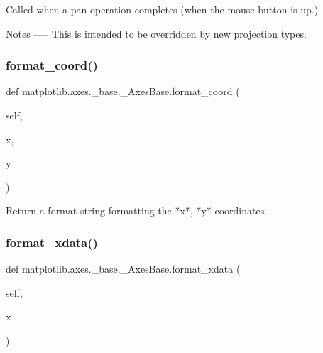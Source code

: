 \begin{DoxyVerb}Called when a pan operation completes (when the mouse button is up.)

Notes
-----
This is intended to be overridden by new projection types.
\end{DoxyVerb}
 \mbox{\label{classmatplotlib_1_1axes_1_1__base_1_1__AxesBase_a6f25add0375c3fd8f4d80280ee06b030}} 
\subsubsection{\texorpdfstring{format\+\_\+coord()}{format\_coord()}}
{\footnotesize\ttfamily def matplotlib.\+axes.\+\_\+base.\+\_\+\+Axes\+Base.\+format\+\_\+coord (\begin{DoxyParamCaption}\item[{}]{self,  }\item[{}]{x,  }\item[{}]{y }\end{DoxyParamCaption})}

\begin{DoxyVerb}Return a format string formatting the *x*, *y* coordinates.\end{DoxyVerb}
 \mbox{\label{classmatplotlib_1_1axes_1_1__base_1_1__AxesBase_a37a99f575bf8ab97da6e1b059f12bf51}} 
\subsubsection{\texorpdfstring{format\+\_\+xdata()}{format\_xdata()}}
{\footnotesize\ttfamily def matplotlib.\+axes.\+\_\+base.\+\_\+\+Axes\+Base.\+format\+\_\+xdata (\begin{DoxyParamCaption}\item[{}]{self,  }\item[{}]{x }\end{DoxyParamCaption})}

